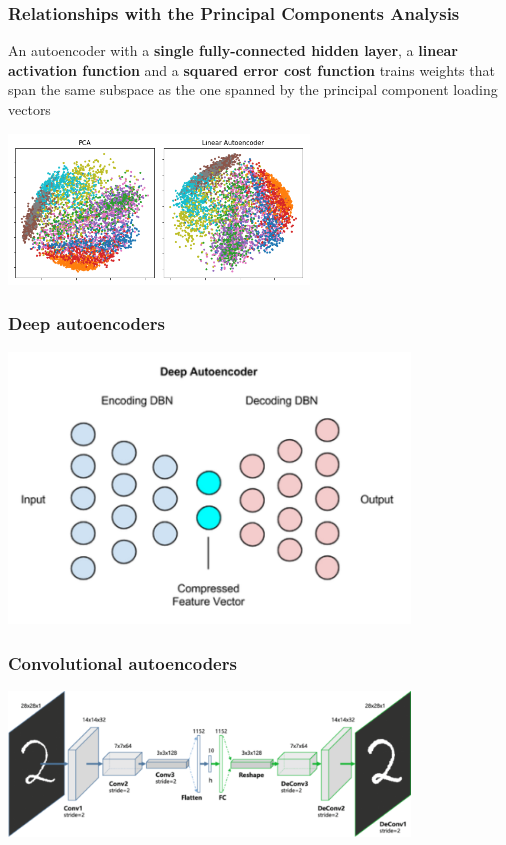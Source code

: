 \documentclass[11pt,a4paper]{beamer}
\begin{document}
\begin{frame}
	\frametitle{Relationships with the Principal Components Analysis}

	\begin{block}{}
		An autoencoder with a \textbf{single fully-connected hidden layer}, a \textbf{linear activation function} and a \textbf{squared error cost function} trains weights that span the same subspace as the one spanned by the principal component loading vectors
	\end{block}

	\centering
	\includegraphics[width=0.6\textwidth]{figures/PCA_vs_Linear_Autoencoder.png}

\end{frame}

\begin{frame}
	\frametitle{Deep autoencoders}
	\centering
	\includegraphics[width=0.8\textwidth]{figures/deep_AE.png}
\end{frame}

\begin{frame}
	\frametitle{Convolutional autoencoders}
	\centering
	\includegraphics[width=0.8\textwidth]{figures/CNN_AE.png}
\end{frame}
\end{document}
